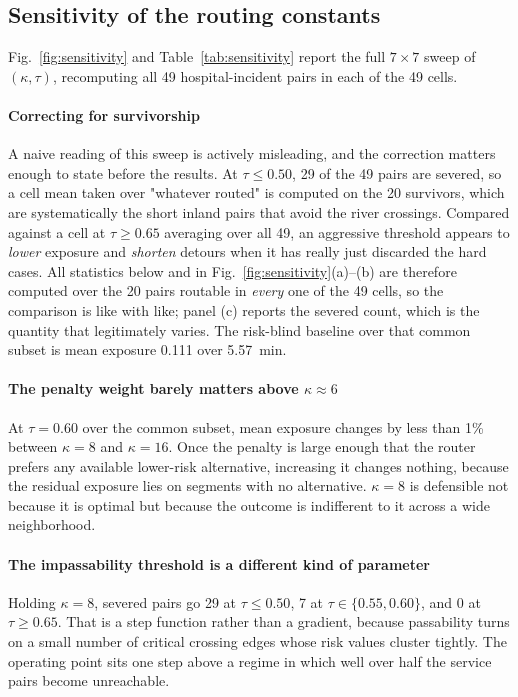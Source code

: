 \documentclass[10pt,twocolumn]{article}
\begin{document}
\subsection{Sensitivity of the routing constants}
\label{sec:res-sensitivity}

Fig.~\ref{fig:sensitivity} and Table~\ref{tab:sensitivity} report the full
$7\times7$ sweep of $(\kappa,\tau)$, recomputing all 49 hospital-incident pairs
in each of the 49 cells.

\paragraph{Correcting for survivorship} A naive reading of this sweep is
actively misleading, and the correction matters enough to state before the
results. At $\tau\le0.50$, 29 of the 49 pairs are severed, so a cell mean taken
over "whatever routed" is computed on the 20 survivors, which are systematically
the short inland pairs that avoid the river crossings. Compared against a cell at
$\tau\ge0.65$ averaging over all 49, an aggressive threshold appears to
\emph{lower} exposure and \emph{shorten} detours when it has really just discarded
the hard cases. All statistics below and in
Fig.~\ref{fig:sensitivity}(a)--(b) are therefore computed over the 20 pairs
routable in \emph{every} one of the 49 cells, so the comparison is like with
like; panel (c) reports the severed count, which is the quantity that legitimately
varies. The risk-blind baseline over that common subset is mean exposure 0.111
over \SI{5.57}{\minute}.

\paragraph{The penalty weight barely matters above $\kappa\approx6$}
At $\tau=0.60$ over the common subset, mean exposure changes by less than 1\%
between $\kappa=8$ and $\kappa=16$. Once the penalty is large enough that the
router prefers any available lower-risk alternative, increasing it changes
nothing, because the residual exposure lies on segments with no alternative.
$\kappa=8$ is defensible not because it is optimal but because the outcome is
indifferent to it across a wide neighborhood.

\paragraph{The impassability threshold is a different kind of parameter}
Holding $\kappa=8$, severed pairs go 29 at $\tau\le0.50$, 7 at
$\tau\in\{0.55,0.60\}$, and 0 at $\tau\ge0.65$. That is a step function rather
than a gradient, because passability turns on a small number of critical crossing
edges whose risk values cluster tightly. The operating point sits one step above
a regime in which well over half the service pairs become unreachable.
\end{document}
